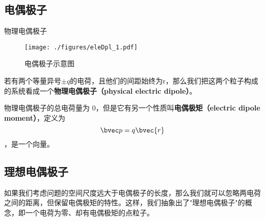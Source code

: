 


\subsection{电偶极子}



\begin{definition}{物理电偶极子}
\begin{figure}[ht]
\centering
\texttt{[image: ./figures/eleDpl\_1.pdf]}
\caption{电偶极子示意图} \label{eleDpl_fig1}
\end{figure}
若有两个等量异号$\pm q$的电荷，且他们的间距始终为r，那么我们把这两个粒子构成的系统看成一个\textbf{物理电偶极子（physical electric dipole）}。

物理电偶极子的总电荷量为 $0$，但是它有另一个性质叫\textbf{电偶极矩（electric dipole moment）}，定义为 
\begin{equation}
\bvec p = q\bvec{r}
\end{equation}
，是一个向量。
\end{definition}

\subsection{理想电偶极子}
如果我们考虑问题的空间尺度远大于电偶极子的长度，那么我们就可以忽略两电荷之间的距离，但保留电偶极矩的特性。这样，我们抽象出了"理想电偶极子"的概念，即一个电荷为零、却有电偶极矩的点粒子。


